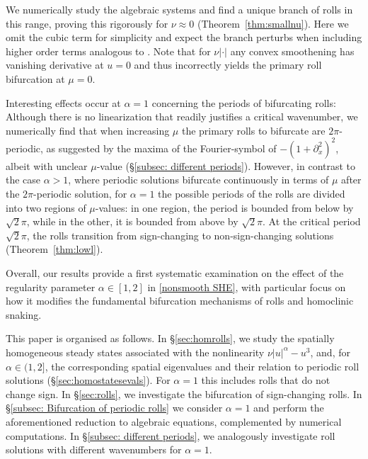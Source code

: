 \documentclass{article}
\numberwithin{equation}{section}
\begin{document}
We numerically study the algebraic systems and find a unique branch of rolls in this range, proving this rigorously for $\nu\approx 0$ (Theorem~\ref{thm:smallnu}). Here we omit the cubic term for simplicity and expect the branch perturbs when including higher order terms analogous to \cite{BettiniCenedeseHaller2024}. Note that for $\nu |\cdot|$ any convex smoothening has vanishing derivative at $u=0$ and thus incorrectly yields the primary roll bifurcation at $\mu=0$. 

Interesting  effects occur at $\alpha=1$ concerning the periods of bifurcating rolls: Although there is no linearization that readily justifies a critical wavenumber, we numerically find that when increasing $\mu$ the primary rolls to bifurcate are $2\pi$-periodic, as suggested by the maxima of the Fourier-symbol of $-(1+\partial_x^2)^2$, albeit with unclear $\mu$-value (\S\ref{subsec: different periods}). However, in contrast to the case $\alpha>1$, where periodic solutions bifurcate continuously in terms of $\mu$ after the $2\pi$-periodic solution, for $\alpha=1$ the possible periods of the rolls are divided into two regions of $\mu$-values: in one region, the period is bounded from below by $\sqrt{2}\pi$, while in the other, it is bounded from above by $\sqrt{2}\pi$. At the critical period $\sqrt{2}\pi$, the rolls transition from sign-changing to non-sign-changing solutions (Theorem~\ref{thm:lowl}).
	
	

Overall, our results provide a first systematic examination on the effect of the regularity parameter $\alpha\in[1,2]$ in \eqref{nonsmooth SHE}, with particular focus on how it modifies the fundamental bifurcation mechanisms of rolls and homoclinic snaking.

\medskip
This paper is organised as follows. In \S\ref{sec:homrolls}, we study the spatially homogeneous steady states associated with the nonlinearity $\nu |u|^\alpha-u^3$, and, for $\alpha\in(1,2]$, the corresponding spatial eigenvalues and their relation to periodic roll solutions (\S\ref{sec:homostatesevals}). For $\alpha=1$ this includes rolls that do not change sign. In \S\ref{sec:rolls}, we  investigate the bifurcation of sign-changing rolls.  
In \S\ref{subsec: Bifurcation of periodic rolls} we consider $\alpha=1$ and perform the aforementioned reduction to algebraic equations, complemented by numerical computations. In \S\ref{subsec: different periods}, we analogously investigate roll solutions with different wavenumbers for $\alpha=1$.
\end{document}

